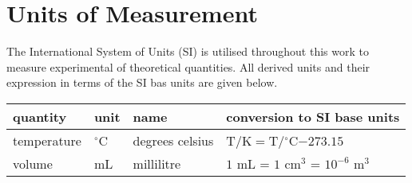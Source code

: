 







\begingroup

\let\clearpage\relax
\let\cleardoublepage\relax
\let\cleardoublepage\relax

\chapter*{Units of Measurement}


\noindent The International System of Units (SI) is utilised throughout this work to measure experimental of theoretical quantities. All derived units and their expression in terms of the SI bas units are given below.\bigskip

\begin{table}[h!]
\centering
\begin{tabular}{ l l l l }
\toprule
quantity & unit & name & conversion to SI base units \\
\midrule
temperature & $^{\circ}$C & degrees celsius &T/K$=$T/$^{\circ}$C$-273.15$ \\
volume & mL & millilitre & $1$ mL = $1$ cm$^3$ = $10^{-6}$ m$^3$ \\
\bottomrule
\end{tabular}
\label{tab:SI}
\end{table}


\endgroup
